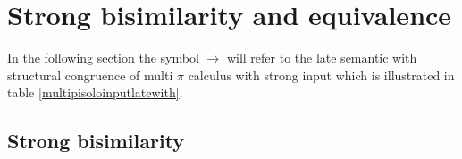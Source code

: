 % 
% 

\section{Strong bisimilarity and equivalence}

In the following section the symbol $\rightarrow$ will refer to the late semantic with structural congruence of multi $\pi$ calculus with strong input which is illustrated in table \ref{multipisoloinputlatewith}.

\subsection{Strong bisimilarity}

